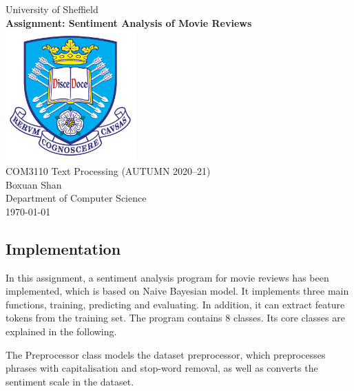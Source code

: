 \documentclass[11pt,a4paper]{article}
\begin{document}
\begin{titlepage}


    \begin{center}
        {\LARGE University of Sheffield}\\[1.5cm]
        \linespread{1.2}\huge {\bfseries Assignment: Sentiment Analysis of Movie Reviews}\\[1.5cm]
        \linespread{1}
        \includegraphics[width=5cm]{images/tuoslogo.png}\\[1cm]
        {\large COM3110 Text Processing (AUTUMN 2020--21)}\\[1cm]
        {\Large Boxuan Shan}\\[6cm]
        \large Department of Computer Science\\[1cm]
        \today
    \end{center}

\end{titlepage}


\newpage
\subsection*{\Large Implementation}

In this assignment, a sentiment analysis program for movie reviews has been implemented, which is based on Naive Bayesian model. It implements three main functions, training, predicting and evaluating. In addition, it can extract feature tokens from the training set. The program contains 8 classes. Its core classes are explained in the following.

The Preprocessor class models the dataset preprocessor, which preprocesses phrases with capitalisation and stop-word removal, as well as converts the sentiment scale in the dataset.
\end{document}
